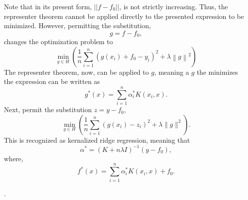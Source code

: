 \documentclass[12pt]{article}
\begin{document}
Note that in its present form, $||f-f_0||$, is not strictly increasing. Thus, the representer theorem cannot be applied directly to the presented expression to be minimized. However, permitting the substitution, 
\begin{equation}
g = f - f_0,
\end{equation}
changes the optimization problem to
\begin{equation}
\min _{g \in H}\left(\frac{1}{n} \sum_{i=1}^{n}\left(g\left(x_{i}\right) + f_0-y_{i}\right)^{2}+\lambda\left\|g\right\|^{2}\right)
\end{equation}
The representer theorem, now, can be applied to $g$, meaning a $g$ the minimizes the expression can be written as
\begin{equation}
g^*(x) = \sum_{i=1}^{n} \alpha^*_i K(x_i, x).
\end{equation}
Next, permit the substitution $z=y-f_0$,
\begin{equation}
\min _{g \in H}\left(\frac{1}{n} \sum_{i=1}^{n}\left(g\left(x_{i}\right)-z_i\right)^{2}+\lambda\|g\|^{2}\right).
\end{equation}
This is recognized as kernalized ridge regression, meaning that
\begin{equation}
\alpha^* = (K+n\lambda I)^{-1} (y - f_0),
\end{equation}
where,
\begin{equation}
f^{*}(x)=\sum_{i=1}^{n} \alpha_{i}^{*} K\left(x_{i}, x\right) + f_0.
\end{equation}

\newpage
.
\newpage
\end{document}
